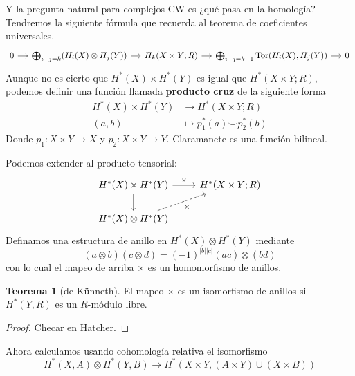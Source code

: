 \documentclass[spanish]{book}
\theoremstyle{definition}
\newtheorem*{teo}{Teorema}
\DeclareMathOperator{\Tor}{Tor}
\begin{document}
Y la pregunta natural para complejos CW es ¿qué pasa en la homología? Tendremos la siguiente fórmula que recuerda al teorema de coeficientes universales.
\[\begin{tikzcd}[column sep=small]
	0\arrow[r]&\bigoplus_{i+j=k}(H_i(X)\otimes H_j(Y))\arrow[r]&H_k(X\times Y;R)\arrow[r]&\bigoplus_{i+j=k-1}\Tor(H_i(X),H_j(Y))\arrow[r]&0
\end{tikzcd}\]
Aunque no es cierto que $H^*(X)\times H^*(Y)$ es igual que $H^*(X\times Y;R)$, podemos definir una función llamada \textbf{producto cruz} de la siguiente forma
\begin{align*}
	H^*(X)\times H^*(Y)&\to H^*(X\times Y;R)\\
	(a,b)&\mapsto p^*_1(a)\smile p_2^*(b)
\end{align*}
Donde $p_1:X\times Y\to X$ y $p_2:X\times Y\to Y$. Claramanete es una función bilineal.

Podemos extender al producto tensorial:
\[\begin{tikzcd}
	H^*(X)\times H^*(Y)\arrow[r,"\times"]\arrow[d]&H^*(X\times Y;R)\\
	H^*(X)\otimes H^*(Y)\arrow[dashed,ur,"\times",swap]
\end{tikzcd}\]
Definamos una estructura de anillo en $H^*(X)\otimes H^*(Y)$ mediante
\[(a\otimes b)(c\otimes d)=(-1)^{|b||c|}(ac)\otimes(bd)\]
con lo cual el mapeo de arriba $\times$ es un homomorfismo de anillos.
\begin{teo} [de Künneth]
	El mapeo $\times$ es un isomorfismo de anillos si $H^*(Y,R)$ es un $R$-módulo libre.
\end{teo}
\begin{proof}
	Checar en Hatcher.
\end{proof}
Ahora calculamos usando cohomología relativa el isomorfismo
\[H^*(X,A)\otimes H^*(Y,B)\to H^*(X\times Y,(A\times Y)\cup (X\times B))\]
\end{document}

